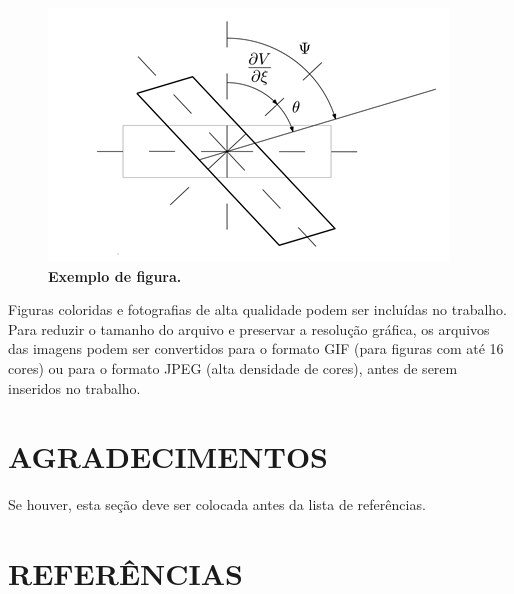\documentclass[10pt,fleqn,a4paper,twoside]{article}
\begin{document}
        \begin{figure}[h]
            \begin{center}
                \includegraphics[angle=0, scale=.8]{figura.png}
            \end{center}
            \caption{\textbf{Exemplo de figura.}}
            \label{fig:figexemplo}
        \end{figure}

        Figuras coloridas e fotografias de alta qualidade podem ser incluídas no trabalho. Para reduzir o tamanho do arquivo e preservar a resolução gráfica, os arquivos das imagens podem ser convertidos para o formato GIF (para figuras com até 16 cores) ou para o formato JPEG (alta densidade de cores), antes de serem inseridos no trabalho.

    \section{AGRADECIMENTOS}
    
        Se houver, esta seção deve ser colocada antes da lista de referências.


    \section{REFERÊNCIAS}
    
    
\end{document}
